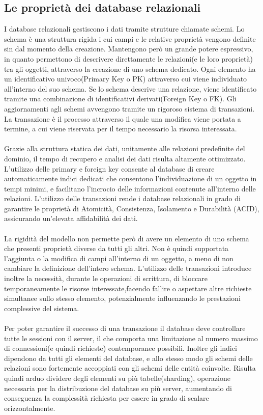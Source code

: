 \subsection{Le proprietà dei database relazionali}


I database relazionali gestiscono i dati tramite strutture chiamate schemi.
Lo schema è una struttura rigida i cui campi e le relative proprietà 
vengono definite sin dal momento della creazione.
Mantengono però un grande potere espressivo, 
in quanto permettono di descrivere direttamente le relazioni(e le loro proprietà) tra gli oggetti, 
attraverso la creazione di uno schema dedicato.
Ogni elemento ha un identificativo univoco(Primary Key o PK) 
attraverso cui viene individuato all'interno del suo schema. 
Se lo schema descrive una relazione, viene identificato tramite
una combinazione di identificativi derivati(Foreign Key o FK).
Gli aggiornamenti agli schemi avvengono tramite un rigoroso sistema di transazioni.
La transazione è il processo attraverso il quale una modifica viene portata a termine,
a cui viene riservata per il tempo necessario la risorsa interessata.\\
\\
Grazie alla struttura statica dei dati, unitamente alle relazioni predefinite del dominio,
il tempo di recupero e analisi dei dati risulta altamente ottimizzato.
L'utilizzo delle primary e foreign key consente al database di creare automaticamente indici 
dedicati che consentono l'individuazione di un oggetto in tempi minimi,
e facilitano l'incrocio delle informazioni contenute all'interno delle relazioni.
L'utilizzo delle transazioni rende i database relazionali in grado di garantire 
le proprietà di Atomicità, Consistenza, Isolamento e Durabilità (ACID),
assicurando un’elevata affidabilità dei dati.\\
\\
La rigidità del modello non permette però di avere un elemento 
di uno schema che presenti proprietà diverse da tutti gli altri.
Non è quindi supportata l'aggiunta o la modifica di campi all'interno di un oggetto,
a meno di non cambiare la definizione dell'intero schema.
L'utilizzo delle transazioni introduce inoltre la necessità, durante le operazioni di scrittura,
di bloccare temporaneamente le risorse interessate,facendo fallire o aspettare altre richieste simultanee sullo stesso elemento,
potenzialmente influenzando le prestazioni complessive del sistema.\\
\\
Per poter garantire il successo di una transazione
il database deve controllare tutte le sessioni con il server,
il che comporta una limitazione al numero massimo di connessioni(e quindi richieste) contemporanee possibili.
Inoltre gli indici dipendono da tutti gli elementi del database,
e allo stesso modo gli schemi delle relazioni sono 
fortemente accoppiati con gli schemi delle entità coinvolte.
Risulta quindi arduo dividere degli elementi su più tabelle(sharding), 
operazione necessaria per la distribuzione del database su più server,
aumentando di conseguenza la complessità richiesta per essere in grado di scalare orizzontalmente.\\
\\

